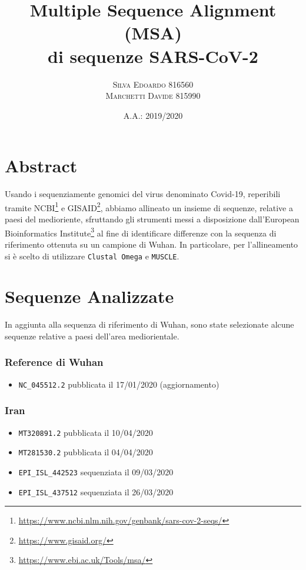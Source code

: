 \documentclass[11pt,italian]{article}
\title{Multiple Sequence Alignment (MSA) \\ di sequenze SARS-CoV-2}
\date{A.A.: 2019/2020}
\author{
	\textsc{Silva Edoardo} 816560 \\
	\textsc{Marchetti Davide} 815990
}
\begin{document}
\maketitle

\section*{Abstract}
Usando i sequenziamente genomici del virus denominato Covid-19, reperibili tramite NCBI\footnote{\url{https://www.ncbi.nlm.nih.gov/genbank/sars-cov-2-seqs/}} e GISAID\footnote{\url{https://www.gisaid.org/}}, abbiamo allineato un insieme di sequenze, relative a paesi del medioriente, sfruttando gli strumenti messi a disposizione dall'European Bioinformatics Institute\footnote{\url{https://www.ebi.ac.uk/Tools/msa/}} al fine di identificare differenze con la sequenza di riferimento ottenuta su un campione di Wuhan.
In particolare, per l'allineamento si è scelto di utilizzare \lstinline{Clustal Omega} e \lstinline{MUSCLE}.


\newpage
\section{Sequenze Analizzate}
In aggiunta alla sequenza di riferimento di Wuhan, sono state selezionate alcune sequenze relative a paesi dell'area mediorientale.

\subsubsection*{Reference di Wuhan}
\begin{itemize}
	\item \lstinline{NC_045512.2} pubblicata il 17/01/2020 (aggiornamento)
\end{itemize}

\subsubsection*{Iran}
\begin{itemize}
	\item \lstinline{MT320891.2} pubblicata il 10/04/2020
	\item \lstinline{MT281530.2} pubblicata il 04/04/2020
	\item \lstinline{EPI_ISL_442523} sequenziata il 09/03/2020
	\item \lstinline{EPI_ISL_437512} sequenziata il 26/03/2020
\end{itemize}
\end{document}
